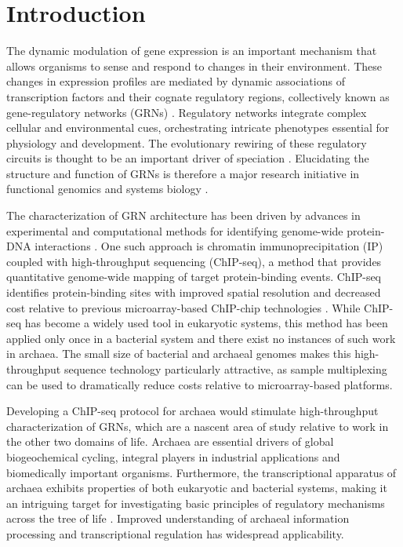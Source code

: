 \section{Introduction}

The dynamic modulation of gene expression is an important mechanism that allows organisms to sense and respond to changes in their environment. These changes in expression profiles are mediated by dynamic associations of transcription factors and their cognate regulatory regions, collectively known as gene-regulatory networks (GRNs) \cite{davidson2001}. Regulatory networks integrate complex cellular and environmental cues, orchestrating intricate phenotypes essential for physiology and development. The evolutionary rewiring of these regulatory circuits is thought to be an important driver of speciation \cite{shou2011measuring}. Elucidating the structure and function of GRNs is therefore a major research initiative in functional genomics and systems biology \cite{harbison_transcriptional_2004, peter_modularity_2009, kaleta_integrative_2010, palaniswamy_agris_2006, fadda_inferring_2009, bonneau_predictive_2007}.

The characterization of GRN architecture has been driven by advances in experimental and computational methods for identifying genome-wide protein-DNA interactions \cite{hesselberth_global_2009, park_chip-seq:_2009, wilbanks2010evaluation, bonneau_inferelator:_2006, de_jong_modeling_2002}. One such approach is chromatin immunoprecipitation (IP) coupled with high-throughput sequencing (ChIP-seq), a method that provides quantitative genome-wide mapping of target protein-binding events. ChIP-seq identifies protein-binding sites with improved spatial resolution and decreased cost relative to previous microarray-based ChIP-chip technologies \cite{park_chip-seq:_2009}. While ChIP-seq has become a widely used tool in eukaryotic systems, this method has been applied only once in a bacterial system \cite{lun_blind_2009} and there exist no instances of such work in archaea. The small size of bacterial and archaeal genomes makes this high-throughput sequence technology particularly attractive, as sample multiplexing can be used to dramatically reduce costs relative to microarray-based platforms.

Developing a ChIP-seq protocol for archaea would stimulate high-throughput characterization of GRNs, which are a nascent area of study relative to work in the other two domains of life. Archaea are essential drivers of global biogeochemical cycling, integral players in industrial applications and biomedically important organisms. Furthermore, the transcriptional apparatus of archaea exhibits properties of both eukaryotic and bacterial systems, making it an intriguing target for investigating basic principles of regulatory mechanisms across the tree of life \cite{bell_archaeal_2005}. Improved understanding of archaeal information processing and transcriptional regulation has widespread applicability.

